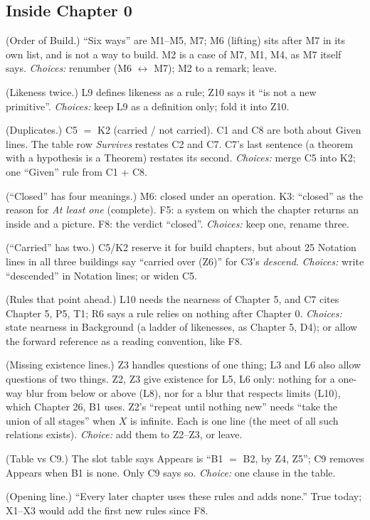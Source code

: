 \subsection*{Inside Chapter 0}
\begin{lines}
\item[\lab{1}] (Order of Build.) ``Six ways'' are M1--M5, M7; M6 (lifting) sits after M7 in its own list, and is not a way to build. M2 is a case of M7, M1, M4, as M7 itself says. \emph{Choices:} renumber (M6 $\leftrightarrow$ M7); M2 to a remark; leave.
\item[\lab{2}] (Likeness twice.) L9 defines likeness as a rule; Z10 says it ``is not a new primitive''. \emph{Choices:} keep L9 as a definition only; fold it into Z10.
\item[\lab{3}] (Duplicates.) C5 $=$ K2 (carried / not carried). C1 and C8 are both about Given lines. The table row \emph{Survives} restates C2 and C7. C7's last sentence (a theorem with a hypothesis is a Theorem) restates its second. \emph{Choices:} merge C5 into K2; one ``Given'' rule from C1 + C8.
\item[\lab{4}] (``Closed'' has four meanings.) M6: closed under an operation. K3: ``closed'' as the reason for \emph{At least one} (complete). F5: a system on which the chapter returns an inside and a picture. F8: the verdict ``closed''. \emph{Choices:} keep one, rename three.
\item[\lab{5}] (``Carried'' has two.) C5/K2 reserve it for build chapters, but about 25 Notation lines in all three buildings say ``carried over (Z6)'' for C3's \emph{descend}. \emph{Choices:} write ``descended'' in Notation lines; or widen C5.
\item[\lab{6}] (Rules that point ahead.) L10 needs the nearness of Chapter 5, and C7 cites Chapter 5, P5, T1; R6 says a rule relies on nothing after Chapter 0. \emph{Choices:} state nearness in Background (a ladder of likenesses, as Chapter 5, D4); or allow the forward reference as a reading convention, like F8.
\item[\lab{7}] (Missing existence lines.) Z3 handles questions of one thing; L3 and L6 also allow questions of two things. Z2, Z3 give existence for L5, L6 only: nothing for a one-way blur from below or above (L8), nor for a blur that respects limits (L10), which Chapter 26, B1 uses. Z2's ``repeat until nothing new'' needs ``take the union of all stages'' when $X$ is infinite. Each is one line (the meet of all such relations exists). \emph{Choice:} add them to Z2--Z3, or leave.
\item[\lab{8}] (Table vs C9.) The slot table says Appears is ``B1 $=$ B2, by Z4, Z5''; C9 removes Appears when B1 is none. Only C9 says so. \emph{Choice:} one clause in the table.
\item[\lab{9}] (Opening line.) ``Every later chapter uses these rules and adds none.'' True today; X1--X3 would add the first new rules since F8.
\end{lines}

